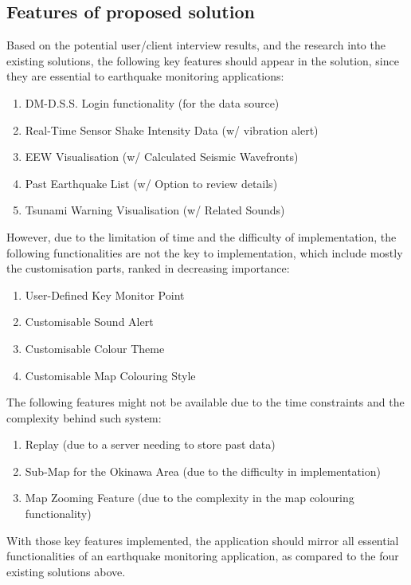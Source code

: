 \documentclass[10pt]{article}
\begin{document}

\subsection{Features of proposed solution}

Based on the potential user/client interview results, and the research into the existing solutions, the following key features should appear in the solution, since they are essential to earthquake monitoring applications:
\begin{enumerate}
    \item DM-D.S.S. Login functionality (for the data source)
    \item Real-Time Sensor Shake Intensity Data (w/ vibration alert)
    \item EEW Visualisation (w/ Calculated Seismic Wavefronts)
    \item Past Earthquake List (w/ Option to review details)
    \item Tsunami Warning Visualisation (w/ Related Sounds)
\end{enumerate}

However, due to the limitation of time and the difficulty of implementation, the following functionalities are not the key to implementation, which include mostly the customisation parts, ranked in decreasing importance:
\begin{enumerate}
    \item User-Defined Key Monitor Point
    \item Customisable Sound Alert
    \item Customisable Colour Theme
    \item Customisable Map Colouring Style
\end{enumerate}

The following features might not be available due to the time constraints and the complexity behind such system:
\begin{enumerate}
    \item Replay (due to a server needing to store past data)
    \item Sub-Map for the Okinawa Area (due to the difficulty in implementation)
    \item Map Zooming Feature (due to the complexity in the map colouring functionality)
\end{enumerate}

With those key features implemented, the application should mirror all essential functionalities of an earthquake monitoring application, as compared to the four existing solutions above.
\end{document}

